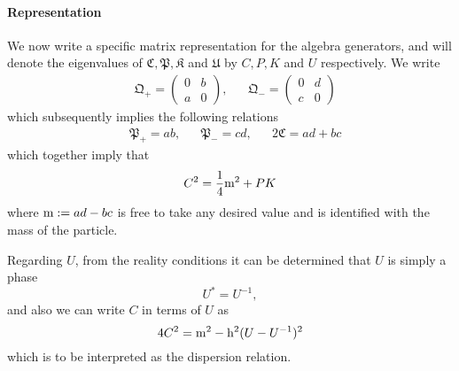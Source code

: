 \documentclass[12pt,a4paper]{article}
\numberwithin{equation}{section}
\begin{document}
\paragraph{Representation}
We now write a specific matrix representation for the algebra generators, and will denote the eigenvalues of $\mathfrak{C}, \mathfrak{P}, \mathfrak{K}$ and $\mathfrak{U}$ by $C,P,K$ and $U$ respectively. We write 
%
\begin{align}
&\mathfrak{Q}_+ = \left(\begin{array}{cc}
0 & b \\
a & 0 
\end{array}
\right),&& \mathfrak{Q}_- = \left(\begin{array}{cc}
0 & d \\
c & 0 
\end{array}
\right)
\end{align}
%
which subsequently implies the following relations 
\begin{align}
&\mathfrak{P}_+ = ab, && \mathfrak{P}_- = cd, && 2\mathfrak{C} = ad+bc
\end{align}
which together imply that 
\begin{equation}
C^2 = \frac{1}{4}{\rm m}^2 + PK
\end{equation}
where ${\rm m}:=ad-bc$ is free to take any desired value and is identified with the mass of the particle. 


Regarding $U$, from the reality conditions it can be determined that $U$ is simply a phase 
\begin{equation}
U^* = U^{-1},
\end{equation}
and also we can write $C$ in terms of $U$ as 
\begin{equation}
4C^2 = {\rm m}^2 -{\rm h}^2(U-U^{-1})^2
\end{equation}
which is to be interpreted as the dispersion relation. 
\end{document}
